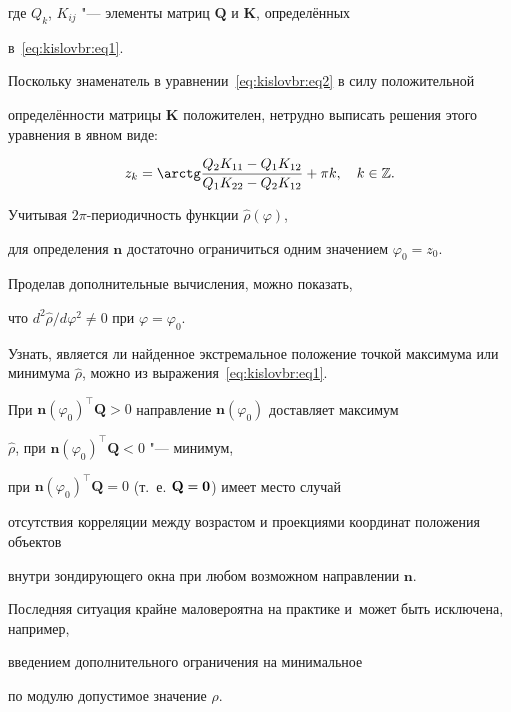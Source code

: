 где $Q_k$, $K_{ij}$ "--- элементы матриц $\mathbf{Q}$ и $\mathbf{K}$, определённых

в~\eqref{eq:kislovbr:eq1}.

Поскольку знаменатель в уравнении~\eqref{eq:kislovbr:eq2} в силу положительной 

определённости матрицы $\mathbf{K}$ положителен, нетрудно выписать решения этого уравнения в явном виде: 

$$z_k=\arctg\frac{Q_2K_{11}-Q_1K_{12}}

{Q_1K_{22}-Q_2K_{12}}+\pi k, \quad  k\in\mathbb{Z}. $$

Учитывая $2\pi$-периодичность функции  $\hat{\rho}(\varphi)$, 

для определения $\mathbf{n}$ достаточно ограничиться одним значением $\varphi_0=z_0$. 

Проделав дополнительные вычисления, можно показать, 

что ${d^2\hat\rho}/{d\varphi^2}\neq0$ при $\varphi=\varphi_0$.

Узнать, является ли найденное экстремальное положение точкой максимума или минимума $\hat\rho$, можно из выражения~\eqref{eq:kislovbr:eq1}. 

При $\mathbf{n}(\varphi_0)^\top \mathbf{Q}>0$ направление $\mathbf{n}(\varphi_0)$ доставляет максимум 

$\hat\rho$, при $\mathbf{n}(\varphi_0)^\top \mathbf{Q}<0$ "--- минимум, 

при $\mathbf{n}(\varphi_0)^\top \mathbf{Q}=0$ (т.~е. $\mathbf{Q}=\bf 0$) имеет место случай 

отсутствия корреляции  между возрастом и проекциями координат положения объектов 

внутри зондирующего окна при любом возможном направлении $\mathbf{n}$. 

Последняя ситуация крайне маловероятна на практике  и~может быть исключена, например,

введением дополнительного ограничения на минимальное 

по модулю допустимое значение $\hat\rho$.





